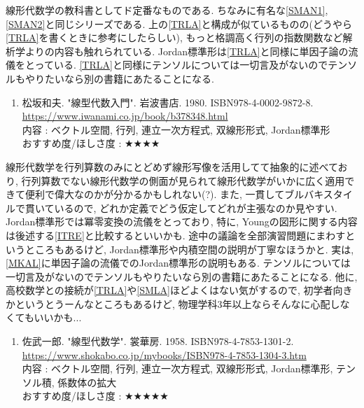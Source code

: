 \documentclass[10pt,a4paper]{jsarticle}
\begin{document}
    線形代数学の教科書としてド定番なものである. ちなみに有名な\ref{SMAN1}, \ref{SMAN2}と同じシリーズである. 上の\ref{TRLA}と構成が似ているものの(どうやら\ref{TRLA}を書くときに参考にしたらしい), もっと格調高く行列の指数関数など解析学よりの内容も触れられている. Jordan標準形は\ref{TRLA}と同様に単因子論の流儀をとっている. \ref{TRLA}と同様にテンソルについては一切言及がないのでテンソルもやりたいなら別の書籍にあたることになる. 
    \begin{enumerate}
        \renewcommand{\theenumi}{[LA\arabic{enumi}]}
        \renewcommand{\labelenumi}{\theenumi}
        \setcounter{enumi}{2}
        \item \label{MKLA} 松坂和夫. "線型代数入門". 岩波書店. 1980. ISBN978-4-0002-9872-8. \\
        \url{https://www.iwanami.co.jp/book/b378348.html} \\
        内容 : ベクトル空間, 行列, 連立一次方程式, 双線形形式, Jordan標準形\\
        おすすめ度/ほしさ度 : $\bigstar \bigstar \bigstar \bigstar $ 
    \end{enumerate}\par
    線形代数学を行列算数のみにとどめず線形写像を活用してて抽象的に述べており, 行列算数でない線形代数学の側面が見られて線形代数学がいかに広く適用できて便利で偉大なのかが分かるかもしれない(?). また, 一貫してブルバキスタイルで貫いているので, どれか定義でどう仮定してどれが主張なのか見やすい. Jordan標準形では冪零変換の流儀をとっており, 特に, Youngの図形に関する内容は後述する\ref{ITRE}と比較するといいかも. 途中の議論を全部演習問題にまわすというところもあるけど, Jordan標準形や内積空間の説明が丁寧なほうかと. 実は, \ref{MKAL}に単因子論の流儀でのJordan標準形の説明もある. テンソルについては一切言及がないのでテンソルもやりたいなら別の書籍にあたることになる. 他に, 高校数学との接続が\ref{TRLA}や\ref{SMLA}ほどよくはない気がするので, 初学者向きかというとうーんなところもあるけど, 物理学科3年以上ならそんなに心配しなくてもいいかも... 
    \begin{enumerate}
        \renewcommand{\theenumi}{[LA\arabic{enumi}]}
        \renewcommand{\labelenumi}{\theenumi}
        \setcounter{enumi}{2}
        \item \label{SILA} 佐武一郎. "線型代数学". 裳華房. 1958. ISBN978-4-7853-1301-2. \\
        \url{https://www.shokabo.co.jp/mybooks/ISBN978-4-7853-1304-3.htm} \\
        内容 : ベクトル空間, 行列, 連立一次方程式, 双線形形式, Jordan標準形, テンソル積, 係数体の拡大\\
        おすすめ度/ほしさ度 : $\bigstar \bigstar \bigstar \bigstar \bigstar $ 
    \end{enumerate}\par
\end{document}
